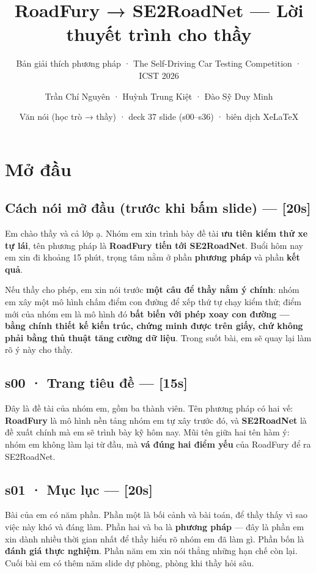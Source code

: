 \documentclass[
  11pt,
]{article}
\title{RoadFury → SE2RoadNet --- Lời thuyết trình cho thầy}
\subtitle{Bản giải thích phương pháp · The Self-Driving Car Testing
Competition · ICST 2026}
\author{Trần Chí Nguyên · Huỳnh Trung Kiệt · Đào Sỹ Duy Minh}
\date{Văn nói (học trò → thầy) · deck 37 slide (s00--s36) · biên dịch
XeLaTeX}
\begin{document}
\maketitle

{
\setcounter{tocdepth}{1}
\tableofcontents
}
\section{Mở đầu}\label{mux1edf-ux111ux1ea7u}

\subsection{Cách nói mở đầu (trước khi bấm slide) ---
{[}20s{]}}\label{cuxe1ch-nuxf3i-mux1edf-ux111ux1ea7u-trux1b0ux1edbc-khi-bux1ea5m-slide-20s}

Em chào thầy và cả lớp ạ. Nhóm em xin trình bày đề tài \textbf{ưu tiên
kiểm thử xe tự lái}, tên phương pháp là \textbf{RoadFury tiến tới
SE2RoadNet}. Buổi hôm nay em xin đi khoảng 15 phút, trọng tâm nằm ở phần
\textbf{phương pháp} và phần \textbf{kết quả}.

Nếu thầy cho phép, em xin nói trước \textbf{một câu để thầy nắm ý
chính}: nhóm em xây một mô hình chấm điểm con đường để xếp thứ tự chạy
kiểm thử; điểm mới của nhóm em là mô hình đó \textbf{bất biến với phép
xoay con đường --- bằng chính thiết kế kiến trúc, chứng minh được trên
giấy, chứ không phải bằng thủ thuật tăng cường dữ liệu}. Trong suốt bài,
em sẽ quay lại làm rõ ý này cho thầy.

\subsection{s00 · Trang tiêu đề ---
{[}15s{]}}\label{s00-trang-tiuxeau-ux111ux1ec1-15s}

Đây là đề tài của nhóm em, gồm ba thành viên. Tên phương pháp có hai vế:
\textbf{RoadFury} là mô hình nền tảng nhóm em tự xây trước đó, và
\textbf{SE2RoadNet} là đề xuất chính mà em sẽ trình bày kỹ hôm nay. Mũi
tên giữa hai tên hàm ý: nhóm em không làm lại từ đầu, mà \textbf{vá đúng
hai điểm yếu} của RoadFury để ra SE2RoadNet.

\subsection{s01 · Mục lục ---
{[}20s{]}}\label{s01-mux1ee5c-lux1ee5c-20s}

Bài của em có năm phần. Phần một là bối cảnh và bài toán, để thầy thấy
vì sao việc này khó và đáng làm. Phần hai và ba là \textbf{phương pháp}
--- đây là phần em xin dành nhiều thời gian nhất để thầy hiểu rõ nhóm em
đã làm gì. Phần bốn là \textbf{đánh giá thực nghiệm}. Phần năm em xin
nói thẳng những hạn chế còn lại. Cuối bài em có thêm năm slide dự phòng,
phòng khi thầy hỏi sâu.
\end{document}
